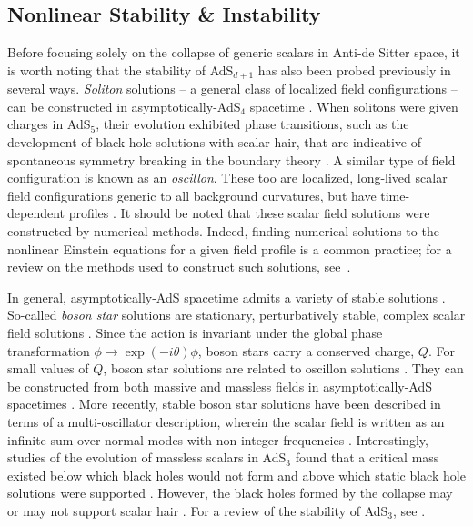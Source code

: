 \documentclass[../PhD.tex]{subfiles}
\begin{document}

\subsection{Nonlinear Stability \& Instability}
\label{ssec: stability intro}

Before focusing solely on the collapse of generic scalars in Anti-de Sitter space, it is worth noting that the stability of AdS$_{d+1}$ has also been probed previously in several ways. \emph{Soliton} solutions -- a general class of localized field configurations -- can be constructed in asymptotically-AdS$_4$ spacetime \cite{hep-th/0406134}. When solitons were given charges in AdS$_5$, their evolution exhibited phase transitions, such as the development of black hole solutions with scalar hair, that are indicative of spontaneous symmetry breaking in the boundary theory \cite{1301.2452}. A similar type of field configuration is known as an \emph{oscillon}. These too are localized, long-lived scalar field configurations generic to all background curvatures, but have time-dependent profiles \cite{hep-ph/9503217}. It should be noted that these scalar field solutions were constructed by numerical methods. Indeed, finding numerical solutions to the nonlinear Einstein equations for a given field profile is a common practice; for a review on the methods used to construct such solutions, see~\cite{1510.02804}. 

In general, asymptotically-AdS spacetime admits a variety of stable solutions \cite{1208.5772, 1503.07746}. So-called \emph{boson star} solutions are stationary, perturbatively stable, complex scalar field solutions \cite{gr-qc/0309131}. Since the \ads action is invariant under the global phase transformation $\phi \to \exp(-i\theta) \phi$, boson stars carry a conserved charge, $Q$. For small values of $Q$, boson star solutions are related to oscillon solutions \cite{1304.4166}. They can be constructed from both massive and massless fields in asymptotically-AdS spacetimes \cite{1209.2378}. More recently, stable boson star solutions have been described in terms of a multi-oscillator description, wherein the scalar field is written as an infinite sum over normal modes with non-integer frequencies \cite{1904.02168}. Interestingly, studies of the evolution of massless scalars in AdS$_3$ found that a critical mass existed below which black holes would not form and above which static black hole solutions were supported \cite{hep-th/9204099}. However, the black holes formed by the collapse may or may not support scalar hair \cite{gr-qc/0007008, gr-qc/0008060, 1303.3186, 1211.7076}. For a review of the stability of AdS$_3$, see \cite{1306.0317}. 
\end{document}
